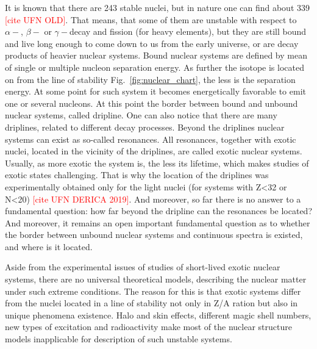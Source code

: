 It is known that there are 243 stable nuclei, but in nature one can find about 339 \textcolor{red}{[cite UFN OLD]}. 
That means, that some of them are unstable with respect to $\alpha-$, $\beta-$ or $\gamma-$decay and fission (for heavy elements), but they are still bound and live long enough to come down to us from the early universe, or are decay products of heavier nuclear systems. 
Bound nuclear systems are defined by mean of single or multiple nucleon separation energy.
As further the isotope is located on from the line of stability Fig.\ \ref{fig:nuclear_chart}, the less is the separation energy.
At some point for such system it becomes energetically favorable to emit one or several nucleons.
At this point the border between bound and unbound nuclear systems, called dripline.
One can also notice that there are many driplines, related to different decay processes.
Beyond the driplines nuclear systems can exist as so-called resonances. 
All resonances, together with exotic nuclei, located in the vicinity of the driplines, are called exotic nuclear systems.
Usually, as more exotic the system is, the less its lifetime, which makes studies of exotic states challenging. 
That is why the location of the driplines was experimentally obtained only for the light nuclei (for systems with Z<32 or N<20) \textcolor{red}{[cite UFN DERICA 2019]}.
And moreover, so far there is no answer to a fundamental question: how far beyond the dripline can the resonances be located? 
And moreover, it remains an open important fundamental question as to whether the border between unbound nuclear systems and continuous spectra is existed, and where is it located.

Aside from the experimental issues of studies of short-lived exotic nuclear systems, there are no universal theoretical models, describing the nuclear matter under such extreme conditions.
The reason for this is that exotic systems differ from the nuclei located in a line of stability not only in Z/A ration but also in unique phenomena existence.
Halo and skin effects, different magic shell numbers, new types of excitation and radioactivity make most of the nuclear structure models inapplicable for description of such unstable systems.

